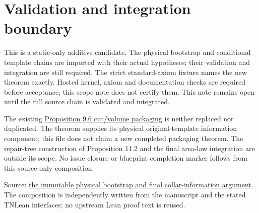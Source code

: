\documentclass{article}
\begin{document}
\section{Validation and integration boundary}
This is a static-only additive candidate.  The physical bootstrap and
conditional template chains are imported with their actual hypotheses;
their validation and integration are still required.  The strict
standard-axiom fixture names the new theorem exactly.
Hosted kernel, axiom and documentation checks are required before
acceptance; this scope note does not certify them.
This note remains open until the full source chain is validated and
integrated.

The existing
\href{https://github.com/LionSR/TNLean/issues/9334}{Proposition 9.6 cut/volume packaging}
is neither replaced nor duplicated.  The theorem supplies its physical
original-template information component; this file does not claim a new
completed packaging theorem.  The repair-tree construction of Proposition
11.2 and the final area-law integration are outside its scope.
No issue closure or blueprint completion marker follows from this
source-only composition.

Source:
\href{https://github.com/openai/math/blob/adc7f1241b42e322a6451854ab7e4b4c146bf78a/preprints/A-two-dimensional-area-law-from-a-global-spectral-gap-September-24-2026/build/sections/08-scanner.tex#L681-L944}{the immutable physical bootstrap and final collar-information argument}.
The composition is independently written from the manuscript and the
stated TNLean interfaces; no upstream Lean proof text is reused.
\end{document}
